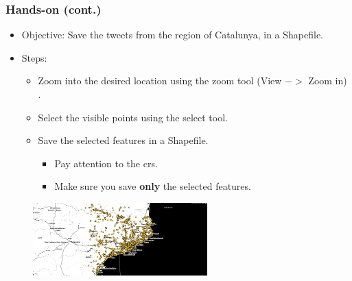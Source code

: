 \documentclass[hyperref={pdfpagelabels=true}]{beamer}
\begin{document}
\begin{frame}
\frametitle{Hands-on (cont.)}
\begin{itemize}
  \item<1->Objective: Save the tweets from the region of Catalunya, in a Shapefile.
  \item<1->Steps:  
  \begin{itemize}
    \item<2->Zoom into the desired location using the zoom tool (View $->$ Zoom in) .  
    \item<2->Select the visible points using the select tool.
    \item<2->Save the selected features in a Shapefile.
    \begin{itemize}
      \item<2->Pay attention to the crs.
      \item<2->Make sure you save \textbf{only} the selected features.      
    \end{itemize}    
  \end{itemize}    
\end{itemize}  

  \begin{figure}  
      \includegraphics[width=0.6\textwidth]{sel_tweets.png}\\
    \end{figure}         
\end{frame}
\end{document}
